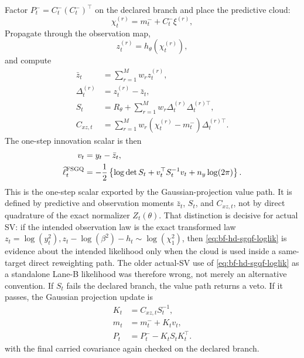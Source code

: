 Factor \(P_t^-=C_t^-(C_t^-)^\top\) on the declared branch and place the
predictive cloud:
\begin{equation}
  \chi_t^{(r)} = m_t^-+C_t^-\xi^{(r)},
  \label{eq:bf-hd-sgqf-obs-placed-points}
\end{equation}
Propagate through the observation map,
\begin{equation}
  z_t^{(r)}=h_\theta(\chi_t^{(r)}),
  \label{eq:bf-hd-sgqf-obs-values}
\end{equation}
and compute
\begin{align}
  \bar z_t&=\sum_{r=1}^Mw_rz_t^{(r)},
  \label{eq:bf-hd-sgqf-obs-mean}\\
  \Delta_t^{(r)}&=z_t^{(r)}-\bar z_t,
  \label{eq:bf-hd-sgqf-obs-centered}\\
  S_t&=R_\theta+\sum_{r=1}^Mw_r
  \Delta_t^{(r)}\Delta_t^{(r)\top},
  \label{eq:bf-hd-sgqf-obs-cov}\\
  C_{xz,t}&=\sum_{r=1}^Mw_r
  (\chi_t^{(r)}-m_t^-)\Delta_t^{(r)\top}.
  \label{eq:bf-hd-sgqf-cross-cov}
\end{align}
The one-step innovation scalar is then
\begin{align}
  v_t&=y_t-\bar z_t,
  \label{eq:bf-hd-sgqf-innovation}\\
  \widehat\ell_t^{\rm FSGQ}
  &=-\frac12
  \left\{\log\det S_t+v_t^\top S_t^{-1}v_t+n_y\log(2\pi)\right\}.
  \label{eq:bf-hd-sgqf-loglik}
\end{align}
This is the one-step scalar exported by the Gaussian-projection value path.  It
is defined by predictive and observation moments \(\bar z_t\), \(S_t\), and
\(C_{xz,t}\), not by direct quadrature of the exact normalizer
\(Z_t(\theta)\).  That distinction is decisive for actual SV: if the intended
observation law is the exact transformed law
\(
 z_t=\log(y_t^2),
 z_t-\log(\beta^2)-h_t\sim\log(\chi_1^2)
\),
then \eqref{eq:bf-hd-sgqf-loglik} is evidence about the intended likelihood only
when the cloud is used inside a same-target direct reweighting path.  The older
actual-SV use of \eqref{eq:bf-hd-sgqf-loglik} as a standalone Lane-B likelihood
was therefore wrong, not merely an alternative convention.
If \(S_t\) fails the declared branch, the value path returns a veto.  If it
passes, the Gaussian projection update is
\begin{align}
  K_t&=C_{xz,t}S_t^{-1},
  \label{eq:bf-hd-sgqf-kalman-gain}\\
  m_t&=m_t^-+K_tv_t,
  \label{eq:bf-hd-sgqf-filter-mean}\\
  P_t&=P_t^- - K_tS_tK_t^\top.
  \label{eq:bf-hd-sgqf-filter-cov}
\end{align}
with the final carried covariance again checked on the declared branch.

